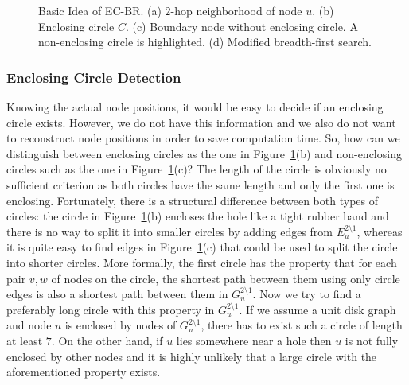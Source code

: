 \documentclass{llncs}
\begin{document}
\begin{figure}[t]
\centering
\hfill
{}
\hfill
{}
\hfill
{}
\hfill
{}
\hfill{}
\caption{Basic Idea of EC-BR. (a) $2$-hop neighborhood of node $u$. (b) Enclosing circle $\mathit{C}$. (c) Boundary node without enclosing circle. A non-enclosing circle is highlighted. 
(d) Modified breadth-first search.}
\label{fig::ecbr_idea}
\end{figure}


\subsubsection{Enclosing Circle Detection}
Knowing the actual node positions, it would be easy to decide if an enclosing circle exists.
However, we do not have this information and we also do not want to reconstruct node positions in order to save computation time.
So, how can we distinguish between enclosing circles as the one in Figure~\ref{fig::ecbr_idea}(b) and non-enclosing circles such as the one in Figure~\ref{fig::ecbr_idea}(c)?
The length of the circle is obviously no sufficient criterion as both circles have the same length and only the first one is enclosing.
Fortunately, there is a structural difference between both types of circles: the circle in Figure~\ref{fig::ecbr_idea}(b) encloses the hole like a tight rubber band and there is no way to split it into smaller circles by adding edges from $E_u^{2\setminus1}$, whereas it is quite easy to find edges in Figure~\ref{fig::ecbr_idea}(c) that could be used to split the circle into shorter circles.
More formally, the first circle has the property that for each pair ${v,w}$ of nodes on the circle, the shortest path between them using only circle edges is also a shortest path between them in $G_u^{2\setminus1}$.
Now we try to find a preferably long circle with this property in $G_u^{2\setminus1}$.
If we assume a unit disk graph and node $u$ is enclosed by nodes of  $G_u^{2\setminus1}$, there has to exist such a circle of length at least $7$.
On the other hand, if $u$ lies somewhere near a hole then $u$ is not fully enclosed by other nodes and it is highly unlikely that a large circle with the aforementioned property exists.
\end{document}
